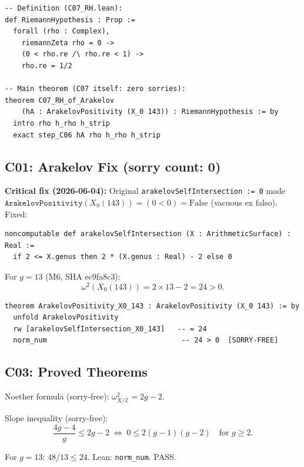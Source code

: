 \documentclass[12pt,letterpaper]{article}
\begin{document}
\begin{verbatim}
-- Definition (C07_RH.lean):
def RiemannHypothesis : Prop :=
  forall (rho : Complex),
    riemannZeta rho = 0 ->
    (0 < rho.re /\ rho.re < 1) ->
    rho.re = 1/2

-- Main theorem (C07 itself: zero sorries):
theorem C07_RH_of_Arakelov
    (hA : ArakelovPositivity (X_0 143)) : RiemannHypothesis := by
  intro rho h_rho h_strip
  exact step_C06 hA rho h_rho h_strip
\end{verbatim}

\subsection{C01: Arakelov Fix (sorry count: 0)}

\textbf{Critical fix (2026-06-04):}
Original \texttt{arakelovSelfIntersection := 0} made
$\texttt{ArakelovPositivity}(X_0(143)) = (0 < 0) = \mathrm{False}$ (vacuous ex falso).
Fixed:

\begin{verbatim}
noncomputable def arakelovSelfIntersection (X : ArithmeticSurface) : Real :=
  if 2 <= X.genus then 2 * (X.genus : Real) - 2 else 0
\end{verbatim}

For $g = 13$ (M6, SHA ec9fa8c3):
\begin{equation}
  \omega^2(X_0(143)) = 2 \times 13 - 2 = 24 > 0.
  \label{eq:arakelov24}
\end{equation}

\begin{verbatim}
theorem ArakelovPositivity_X0_143 : ArakelovPositivity (X_0 143) := by
  unfold ArakelovPositivity
  rw [arakelovSelfIntersection_X0_143]   -- = 24
  norm_num                                -- 24 > 0  [SORRY-FREE]
\end{verbatim}

\subsection{C03: Proved Theorems}

Noether formula (sorry-free): $\omega^2_{X/\mathbb{Z}} = 2g - 2$.

Slope inequality (sorry-free):
\begin{equation}
  \frac{4g - 4}{g} \leq 2g - 2
  \;\Leftrightarrow\;
  0 \leq 2(g-1)(g-2)
  \quad\text{for }g \geq 2.
  \label{eq:slope}
\end{equation}

For $g = 13$: $48/13 \leq 24$. Lean: \texttt{norm\_num}. PASS.
\end{document}
